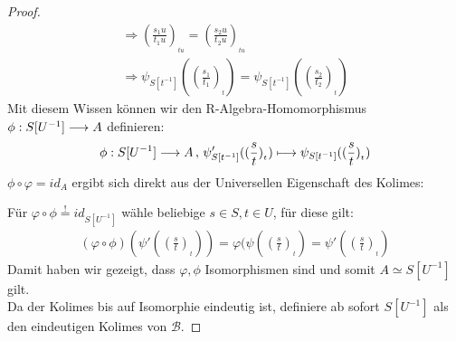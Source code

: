 \documentclass[10pt,a4paper]{report}
\newcommand{\functionfront}[3]{\nolinebreak{#1:#2 \longrightarrow #3}}
\newcommand{\function}[5]{\nolinebreak{#1:#2 \longrightarrow #3 \, , \, #4 \longmapsto #5}}
\newcommand{\lok}[2]{#1 [#2^{-1}]}
\newcommand{\loke}[3]{(\frac{#1}{#2})_{_{#3}}}
\newcommand*{\defshow}{\stackrel{!}{=}}
\begin{document}
\begin{proof}
\begin{align*}
\Rightarrow  \loke{s_1u}{t_1u}{tu} = \loke{s_2u}{t_2u}{tu}\\
\Rightarrow  \psi_{\lok{S}{t}}(\loke{s_1}{t_1}{t}) = \psi_{\lok{S}{t}}(\loke{s_2}{t_2}{t})
\end{align*}
Mit diesem Wissen können wir den R-Algebra-Homomorphismus $\functionfront{\phi}{\lok{S}{U}}{A}$ definieren:
\begin{gather*}
\function{\phi}{\lok{S}{U}}{A}{\psi'_{\lok{S}{t}}(\loke{s}{t}{t})}{\psi_{\lok{S}{t}}(\loke{s}{t}{t})}
\end{gather*}
$\phi \circ \varphi = id_A$ ergibt sich direkt aus der Universellen Eigenschaft des Kolimes:
\begin{center}
\end{center}
Für $\varphi \circ \phi \defshow id_{\lok{S}{U}}$ wähle beliebige $s \in S , t \in U$, für diese gilt:
\begin{gather*}
(\varphi \circ \phi)(\psi'(\loke{s}{t}{t})) =
 \varphi (\psi(\loke{s}{t}{t}) =
  \psi'(\loke{s}{t}{t})
\end{gather*}
Damit haben wir gezeigt, dass $\varphi,\phi$ Isomorphismen sind und somit $A \simeq \lok{S}{U}$ gilt.\\
Da der Kolimes bis auf Isomorphie eindeutig ist, definiere ab sofort $\lok{S}{U}$ als den eindeutigen Kolimes von $\mathcal{B}$.
 \end{proof}
\end{document}
